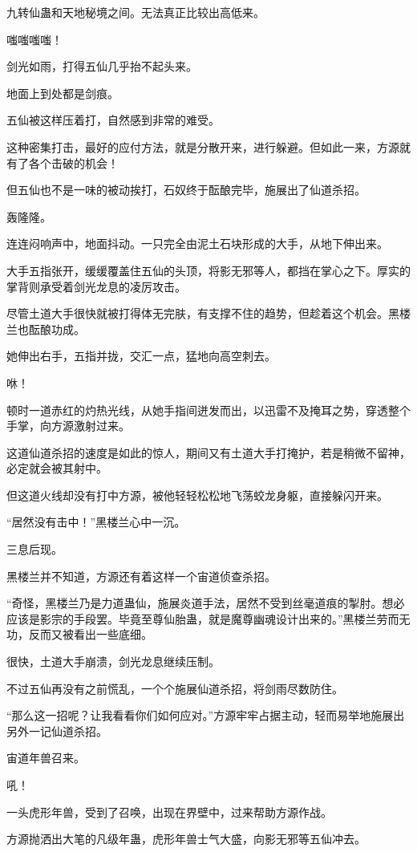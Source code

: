 \begin{this_body}
九转仙蛊和天地秘境之间。无法真正比较出高低来。

嗤嗤嗤嗤！

剑光如雨，打得五仙几乎抬不起头来。

地面上到处都是剑痕。

五仙被这样压着打，自然感到非常的难受。

这种密集打击，最好的应付方法，就是分散开来，进行躲避。但如此一来，方源就有了各个击破的机会！

但五仙也不是一味的被动挨打，石奴终于酝酿完毕，施展出了仙道杀招。

轰隆隆。

连连闷响声中，地面抖动。一只完全由泥土石块形成的大手，从地下伸出来。

大手五指张开，缓缓覆盖住五仙的头顶，将影无邪等人，都挡在掌心之下。厚实的掌背则承受着剑光龙息的凌厉攻击。

尽管土道大手很快就被打得体无完肤，有支撑不住的趋势，但趁着这个机会。黑楼兰也酝酿功成。

她伸出右手，五指并拢，交汇一点，猛地向高空刺去。

咻！

顿时一道赤红的灼热光线，从她手指间迸发而出，以迅雷不及掩耳之势，穿透整个手掌，向方源激射过来。

这道仙道杀招的速度是如此的惊人，期间又有土道大手打掩护，若是稍微不留神，必定就会被其射中。

但这道火线却没有打中方源，被他轻轻松松地飞荡蛟龙身躯，直接躲闪开来。

“居然没有击中！”黑楼兰心中一沉。

三息后现。

黑楼兰并不知道，方源还有着这样一个宙道侦查杀招。

“奇怪，黑楼兰乃是力道蛊仙，施展炎道手法，居然不受到丝毫道痕的掣肘。想必应该是影宗的手段罢。毕竟至尊仙胎蛊，就是魔尊幽魂设计出来的。”黑楼兰劳而无功，反而又被看出一些底细。

很快，土道大手崩溃，剑光龙息继续压制。

不过五仙再没有之前慌乱，一个个施展仙道杀招，将剑雨尽数防住。

“那么这一招呢？让我看看你们如何应对。”方源牢牢占据主动，轻而易举地施展出另外一记仙道杀招。

宙道年兽召来。

吼！

一头虎形年兽，受到了召唤，出现在界壁中，过来帮助方源作战。

方源抛洒出大笔的凡级年蛊，虎形年兽士气大盛，向影无邪等五仙冲去。


\end{this_body}
